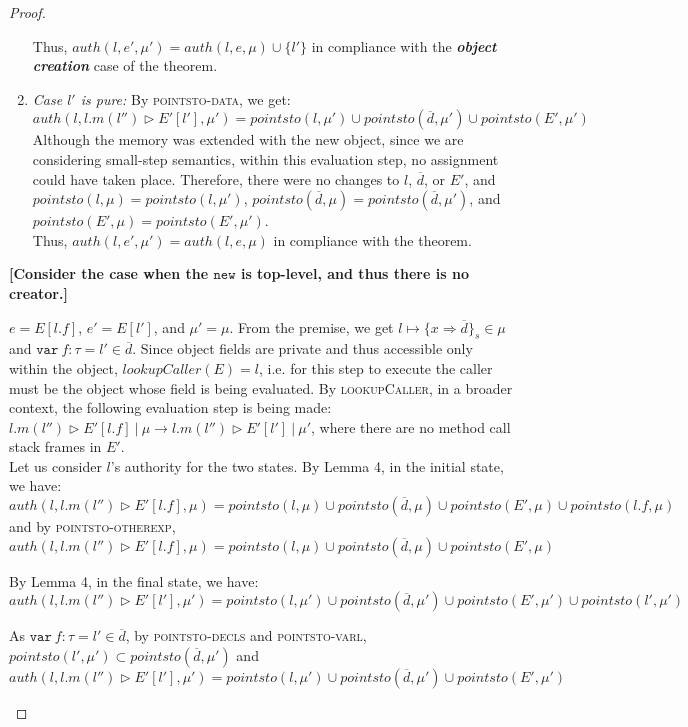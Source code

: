 \documentclass{llncs}
\newcommand{\keywadj}[1]{\mathtt{#1}}
\newcommand{\keyw}[1]{\keywadj{#1}~}
\newcommand{\todo}[1]{\textbf{[#1]}}
\newcommand{\pcase}[1][]{
  \if\relax\detokenize{#1}\relax
    \def\thiscase{}
  \else
    \def\thiscase{~#1}
  \fi
  \item
}
\begin{document}
\begin{proof}
\begin{pcases}
\begin{enumerate}
Thus, $auth(l, e', \mu') = auth(l, e, \mu) \cup \{ l' \}$ in compliance with the \textbf{\textit{object creation}} case of the theorem.
\\
\item[] \textit{Case $l'$ is pure:} By \textsc{pointsto-data}, we get:
\[
auth(l, l.m(l'') \rhd E'[l'], \mu') = pointsto(l, \mu') \cup pointsto(\overline{d}, \mu') \cup pointsto(E', \mu')
\]
Although the memory was extended with the new object, since we are considering small-step semantics, within this evaluation step, no assignment could have taken place. Therefore, there were no changes to $l$, $\overline{d}$, or $E'$, and $pointsto(l, \mu) = pointsto(l, \mu')$, $pointsto(\overline{d}, \mu) = pointsto(\overline{d}, \mu')$, and $pointsto(E', \mu) = pointsto(E', \mu')$.\\

Thus, $auth(l, e', \mu') = auth(l, e, \mu)$ in compliance with the theorem.\\
\end{enumerate}

\todo{Consider the case when the $\keywadj{new}$ is top-level, and thus there is no creator.}
\\
\pcase[\textsc{E-Field}]
$e = E[l.f]$, $e' = E[l']$, and $\mu' = \mu$. From the premise, we get $l \mapsto \{ x \Rightarrow \overline{d} \}_{s} \in \mu$ and $\keyw{var} f : \tau = l' \in \overline{d}$. Since object fields are private and thus accessible only within the object, $lookupCaller(E) = l$, i.e. for this step to execute the caller must be the object whose field is being evaluated. By \textsc{lookupCaller}, in a broader context, the following evaluation step is being made: \mbox{$l.m(l'') \rhd E'[l.f]~|~\mu \longrightarrow l.m(l'') \rhd E'[l']~|~\mu'$}, where there are no method call stack frames in $E'$.\\

Let us consider $l$'s authority for the two states. By Lemma 4, in the initial state, we have:
\[
auth(l, l.m(l'') \rhd E'[l.f], \mu) = pointsto(l, \mu) \cup pointsto(\overline{d}, \mu) \cup pointsto(E', \mu) \cup pointsto(l.f, \mu)
\]
and by \textsc{pointsto-otherexp},
\[
auth(l, l.m(l'') \rhd E'[l.f], \mu) = pointsto(l, \mu) \cup pointsto(\overline{d}, \mu) \cup pointsto(E', \mu)
\]

By Lemma 4, in the final state, we have:
\[
auth(l, l.m(l'') \rhd E'[l'], \mu') = pointsto(l, \mu') \cup pointsto(\overline{d}, \mu') \cup pointsto(E', \mu') \cup pointsto(l', \mu')
\]

As $\keyw{var} f : \tau = l' \in \overline{d}$, by \textsc{pointsto-decls} and \textsc{pointsto-varl}, $pointsto(l', \mu') \subset pointsto(\overline{d}, \mu')$ and
\[
auth(l, l.m(l'') \rhd E'[l'], \mu') = pointsto(l, \mu') \cup pointsto(\overline{d}, \mu') \cup pointsto(E', \mu')
\]


\end{pcases}
\end{proof}
\end{document}
